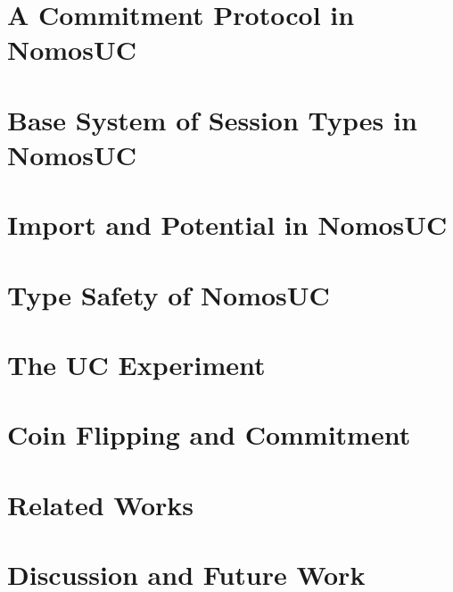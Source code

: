\documentclass[acmsmall, screen, review, anonymous]{acmart}
\begin{document}
\section{A Commitment Protocol in NomosUC} \label{sec:example}


\section{Base System of Session Types in NomosUC} \label{sec:basic}


\section{Import and Potential in NomosUC} \label{sec:import}


\section{Type Safety of NomosUC} \label{sec:safety}


\section{The UC Experiment} \label{sec:execuc}


\section{Coin Flipping and Commitment} \label{sec:commitment}



\section{Related Works} \label{sec:related}


\section{Discussion and Future Work}






\appendix

%
\end{document}
